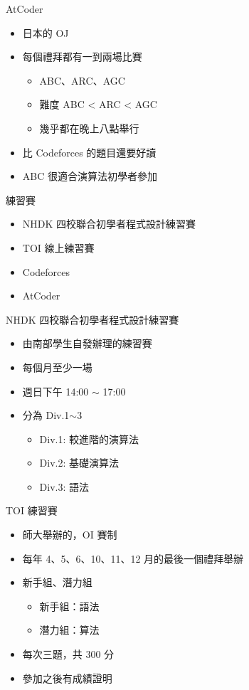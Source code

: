 \documentclass[aspectratio=169]{beamer}
\begin{document}
	\begin{frame}{AtCoder}
		\begin{itemize}
			\item 日本的 OJ
			\item 每個禮拜都有一到兩場比賽
				\begin{itemize}
					\item ABC、ARC、AGC
					\item 難度 ABC < ARC < AGC
					\item 幾乎都在晚上八點舉行
				\end{itemize}
			\item 比 Codeforces 的題目還要好讀
			\item ABC 很適合演算法初學者參加
		\end{itemize}
	\end{frame}

	\begin{frame}{練習賽}
		\begin{itemize}
			\item NHDK 四校聯合初學者程式設計練習賽
			\item TOI 線上練習賽
			\item Codeforces
			\item AtCoder
		\end{itemize}
	\end{frame}

	\begin{frame}{NHDK 四校聯合初學者程式設計練習賽}
		\begin{itemize}
			\item 由南部學生自發辦理的練習賽
			\item 每個月至少一場
			\item 週日下午 14:00 $\sim$ 17:00
			\item 分為 Div.1$\sim$3
				\begin{itemize}
					\item Div.1: 較進階的演算法
					\item Div.2: 基礎演算法
					\item Div.3: 語法
				\end{itemize}
		\end{itemize}
	\end{frame}

	\begin{frame}{TOI 練習賽}
		\begin{itemize}
			\item 師大舉辦的，OI 賽制
			\item 每年 4、5、6、10、11、12 月的最後一個禮拜舉辦
			\item 新手組、潛力組
				\begin{itemize}
					\item 新手組：語法
					\item 潛力組：算法
				\end{itemize}
			\item 每次三題，共 300 分
			\item 參加之後有成績證明
		\end{itemize}
	\end{frame}
\end{document}
